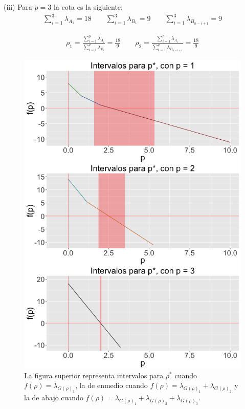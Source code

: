 \begin{example}
(iii) Para $p = 3$ la cota es la siguiente:
\begin{equation*}
  \begin{aligned}
  \sum_{i = 1}^{3}\lambda_{A_1}  = 18 \qquad
  \sum_{i = 1}^{3}\lambda_{B_1}  = 9 \qquad
  \sum_{i = 1}^{3}\lambda_{B_{n-i+1}}  = 9
  \end{aligned}
\end{equation*}

\begin{equation*}
  \begin{aligned}
\rho_1 = \frac{\sum_{i = 1}^{p}\lambda_{A_i}}{\sum_{i = 1}^{p}\lambda_{B_i}}  = \frac{18}{9} \qquad
\rho_2 = \frac{\sum_{i = 1}^{p}\lambda_{A_i}}{\sum_{i = 1}^{p}\lambda_{B_{n-i+1}}}  = \frac{18}{9}
  \end{aligned}
\end{equation*}

\end{example}

\begin{figure}[!ht] \label{Fig1.7}
  \centering
  \includegraphics[width=.9 \textwidth]{Figures/Chapter2_grid3eigen_interv2}  
  \caption[Intervalos para $\rho^*$.] {La figura superior representa intervalos para $\rho^*$ cuando $f(\rho) = \lambda_{G(\rho)_1}$, la de enmedio cuando $f(\rho) = \lambda_{G(\rho)_1} + \lambda_{G(\rho)_2}$ y la de abajo cuando $f(\rho) = \lambda_{G(\rho)_1} + \lambda_{G(\rho)_2} + \lambda_{G(\rho)_3}$.}
\end{figure}



